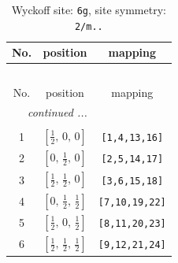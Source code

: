 \documentclass[fleqn,8pt]{jsarticle}
\begin{document}
\renewcommand{\arraystretch}{1.2}
\begin{longtable}{ccc}
\caption{Wyckoff site: {\tt 6g}, site symmetry: {\tt 2/m..}}
 \\
 \hline \hline
No. & position & mapping \\ \hline \endfirsthead

\multicolumn{2}{l}{\tablename\ \thetable{}} \\
 \hline \hline
No. & position & mapping \\ \hline \endhead

 \hline \hline
\multicolumn{2}{r}{\footnotesize\it continued ...} \\ \endfoot

 \hline \hline
\multicolumn{2}{r}{} \\ \endlastfoot

1 & $\left[ \frac{1}{2},\, 0,\, 0 \right]$ & {\tt [1,4,13,16]} \\ \hline
2 & $\left[ 0,\, \frac{1}{2},\, 0 \right]$ & {\tt [2,5,14,17]} \\ \hline
3 & $\left[ \frac{1}{2},\, \frac{1}{2},\, 0 \right]$ & {\tt [3,6,15,18]} \\ \hline
4 & $\left[ 0,\, \frac{1}{2},\, \frac{1}{2} \right]$ & {\tt [7,10,19,22]} \\ \hline
5 & $\left[ \frac{1}{2},\, 0,\, \frac{1}{2} \right]$ & {\tt [8,11,20,23]} \\ \hline
6 & $\left[ \frac{1}{2},\, \frac{1}{2},\, \frac{1}{2} \right]$ & {\tt [9,12,21,24]} \\
\end{longtable}
\renewcommand{\arraystretch}{1.2}
\end{document}
